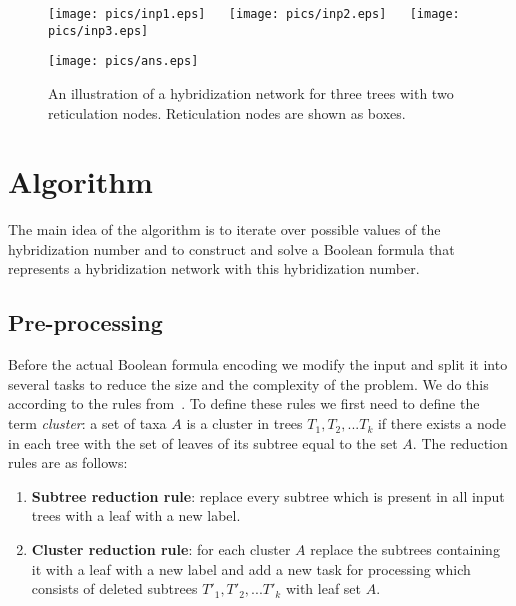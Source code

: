 \documentclass[runningheads, envcountsame, a4paper]{llncs}
\begin{document}
\begin{figure}[t]
  \centering
  \begin{minipage}[b]{0.59\linewidth}
    \texttt{[image: pics/inp1.eps]}
    ~~
    \texttt{[image: pics/inp2.eps]}
    ~~
    \texttt{[image: pics/inp3.eps]}
  \end{minipage}
  \hfill
  \begin{minipage}[b]{0.40\linewidth}
    \texttt{[image: pics/ans.eps]}
  \end{minipage}
  \caption{An illustration of a hybridization network for three trees with two reticulation nodes. Reticulation nodes are shown as boxes.}
  \label{network-example}
\end{figure}

\section{Algorithm}

The main idea of the algorithm is to iterate over possible values of the hybridization number and to construct and solve a Boolean 
formula that represents a hybridization network with this hybridization number.

\subsection{Pre-processing}

Before the actual Boolean formula encoding we modify the input and split it into several tasks to reduce the size 
and the complexity of the problem. We do this according to the rules from~\cite{bonet2009efficiently}. To define these 
rules we first need to define the term \emph{cluster}: a set of taxa $A$ is a cluster in trees $T_1, T_2, ... T_k$ if there 
exists a node in each tree with the set of leaves of its subtree equal to the set $A$. The reduction rules are as follows:

\begin{enumerate}

\item \textbf{Subtree reduction rule}:
replace every subtree which is present in all input trees with a leaf with a new label.

\item \textbf{Cluster reduction rule}:
for each cluster $A$ replace the subtrees containing it with a leaf with a new label and add a new task for processing 
which consists of deleted subtrees $T'_1, T'_2, ... T'_k$ with leaf set $A$.

\end{enumerate}
\end{document}
